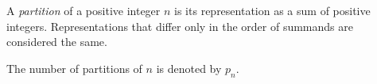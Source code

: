 

\setcounter{section}{3}
\setcounter{subsection}{4}
\setcounter{dfn}{3}

\begin{dfn}
A \emph{partition} of a positive integer $n$ is its representation as a sum of positive integers.
Representations that differ only in the order of summands are considered the same.

The number of partitions of $n$ is denoted by $p_n$.
\end{dfn}


